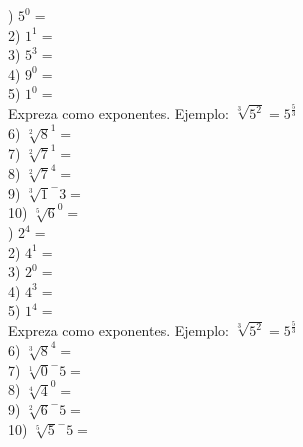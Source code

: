 \documentclass[a4paper,12pt]{article}
\begin{document}
 ) $5^0=$\vspace{1cm}\\ 
2) $1^1=$\vspace{1cm}\\ 
3) $5^3=$\vspace{1cm}\\ 
4) $9^0=$\vspace{1cm}\\ 
5) $1^0=$\vspace{1cm}\\ 
 Expreza como exponentes.
 Ejemplo: $\sqrt[3]{5^2}=5^\frac{5}{3} $  \vspace{0.5cm}\\ 
6) $\sqrt[2]{8}^1=$\vspace{1cm}\\ 
7) $\sqrt[2]{7}^1=$\vspace{1cm}\\ 
8) $\sqrt[2]{7}^4=$\vspace{1cm}\\ 
9) $\sqrt[3]{1}^-3=$\vspace{1cm}\\ 
10) $\sqrt[5]{6}^0=$\vspace{1cm}\\ 

 ) $2^4=$\vspace{1cm}\\ 
2) $4^1=$\vspace{1cm}\\ 
3) $2^0=$\vspace{1cm}\\ 
4) $4^3=$\vspace{1cm}\\ 
5) $1^4=$\vspace{1cm}\\ 
 Expreza como exponentes.
 Ejemplo: $\sqrt[3]{5^2}=5^\frac{5}{3} $  \vspace{0.5cm}\\ 
6) $\sqrt[3]{8}^4=$\vspace{1cm}\\ 
7) $\sqrt[1]{0}^-5=$\vspace{1cm}\\ 
8) $\sqrt[4]{4}^0=$\vspace{1cm}\\ 
9) $\sqrt[2]{6}^-5=$\vspace{1cm}\\ 
10) $\sqrt[5]{5}^-5=$\vspace{1cm}\\ 
\end{document}
